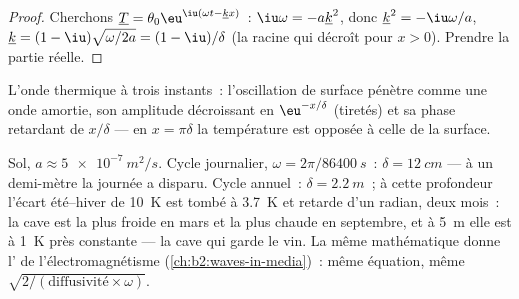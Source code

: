 \begin{proof}
Cherchons $\underline T = \theta_0\eu^{\iu(\omega t - \underline k x)}$~:
$\iu\omega = -a\underline k^2$, donc $\underline k^2 = -\iu\omega/a$,
$\underline k = (1 - \iu)\sqrt{\omega/2a} = (1 - \iu)/\delta$ (la racine
qui décroît pour $x > 0$). Prendre la partie réelle.
\end{proof}

\begin{omfigure}

{\small L'onde thermique à trois instants~: l'oscillation de surface
pénètre comme une onde amortie, son amplitude décroissant en $\eu^{-x/\delta}$
(tiretés) et sa phase retardant de $x/\delta$ --- en $x = \pi\delta$ la
température est opposée à celle de la surface.}
\end{omfigure}

\begin{example}\label{ex:b2:heat-conduction:soil}
Sol, $a \approx \qty{5e-7}{m^2/s}$. Cycle journalier, $\omega = 2\pi/\qty{86400}{s}$~:
$\delta = \qty{12}{cm}$ --- à un demi-mètre la journée a disparu. Cycle annuel~:
$\delta = \qty{2.2}{m}$~; à cette profondeur l'écart été--hiver de \qty{10}{K} est
tombé à \qty{3.7}{K} et retarde d'un radian, deux mois~: la cave est
la plus froide en mars et la plus chaude en septembre, et à \qty{5}{m} elle est
à \qty{1}{K} près constante --- la cave qui garde le vin. La même
mathématique donne l' de l'électromagnétisme
(\cref{ch:b2:waves-in-media})~: même équation, même $\sqrt{2/(\text{diffusivité}
\times\omega)}$.
\end{example}

